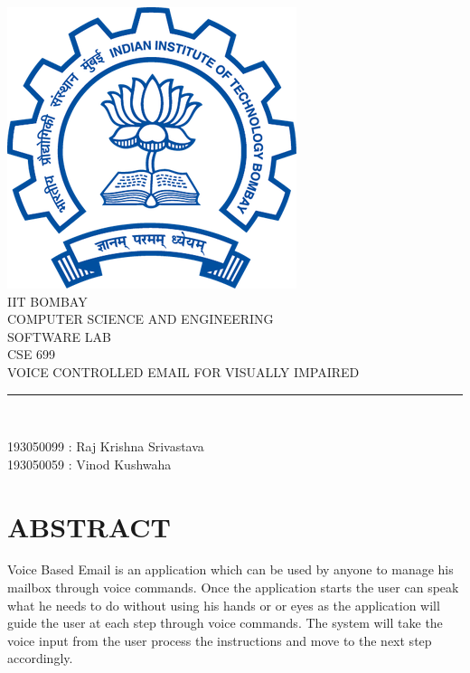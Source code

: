 \documentclass[12pt]{article}
\begin{document}

\begin{titlepage}
	\centering
    \vspace*{0.5 cm}
    \includegraphics[scale = 0.50]{IITB_logo.png}\\[1.0 cm]	%
    \textsc{\LARGE IIT BOMBAY}\\[2.0 cm]
    \textsc{\lARGE COMPUTER SCIENCE AND ENGINEERING}\\[0.2 cm]
    \textsc{\lARGE SOFTWARE LAB}\\[0.2 cm]
	\textsc{\Large CSE 699}\\[0.5 cm]				%
	\textsc{\large VOICE CONTROLLED EMAIL FOR VISUALLY IMPAIRED }\\[0.7 cm]
	\rule{\linewidth}{0.2 mm} \\[0.4 cm]
	
	\begin{centering}
	193050099 : Raj Krishna Srivastava\\
	193050059 : Vinod Kushwaha
	\end{centering}
	
	
\end{titlepage}


\tableofcontents
\pagebreak
\section{ABSTRACT}
Voice Based Email is an application which can be used by anyone to manage his mailbox through voice commands. Once the application starts the user can speak what he needs to do without using his hands or or eyes as the application will guide the user at each step through voice commands. The system will take the voice input from the user process the instructions and move to the next step accordingly.
\end{document}
